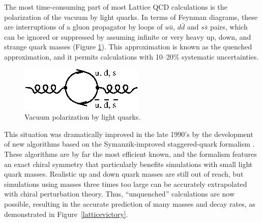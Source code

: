 \documentclass{cornell}
\begin{document}
The most time-consuming part of most Lattice QCD calculations is the
polarization of the vacuum by light quarks.  In terms of Feynman
diagrams, these are interruptions of a gluon propagator by loops of
$u\bar{u}$, $d\bar{d}$ and $s\bar{s}$ pairs, which can be ignored or
suppressed by assuming infinite or very heavy up, down, and strange
quark masses (Figure \ref{vacuumpolarization}).  This approximation is
known as the quenched approximation, and it permits calculations with
10--20\% systematic uncertainties.

\begin{figure}[t]
  \begin{center}
    \includegraphics[width=0.35\linewidth]{vacuumpolarization}
  \end{center}
  \caption[Vacuum polarization by light
  quarks]{\label{vacuumpolarization} Vacuum polarization by light
  quarks.}
\end{figure}

This situation was dramatically improved in the late 1990's by the
development of new algorithms based on the Symanzik-improved
staggered-quark formalism \cite{confronts}.  These algorithms are by
far the most efficient known, and the formalism features an exact
chiral symmetry that particularly benefits simulations with small
light quark masses.  Realistic up and down quark masses are still out
of reach, but simulations using masses three times too large can be
accurately extrapolated with chiral perturbation theory.  Thus,
``unquenched'' calculations are now possible, resulting in the
accurate prediction of many masses and decay rates, as demonstrated in
Figure~\ref{latticevictory}.
\end{document}
